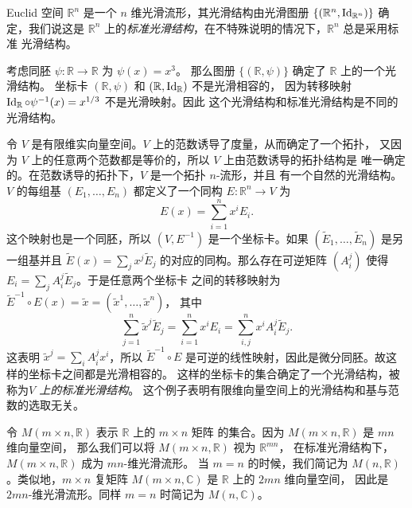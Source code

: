 \begin{example}[Euclid 空间]
  Euclid 空间 $\mathbb{R}^n$ 是一个 $n$ 维光滑流形，其光滑结构由光滑图册
  $\{(\mathbb{R}^n,\operatorname{Id}_{\mathbb{R}^n})\}$ 确定，我们说这是 $\mathbb{R}^n$
  上的\emph{标准光滑结构}，在不特殊说明的情况下，$\mathbb{R}^n$ 总是采用标准
  光滑结构。
\end{example}

\begin{example}
  考虑同胚 $\psi:\mathbb{R}\to\mathbb{R}$ 为 $\psi(x)=x^{3}$。
  那么图册 $\{(\mathbb{R},\psi)\}$ 确定了 $\mathbb{R}$ 上的一个光滑结构。
  坐标卡 $(\mathbb{R},\psi)$ 和 $(\mathbb{R},\operatorname{Id}_{\mathbb{R}})$ 不是光滑相容的，
  因为转移映射 $\operatorname{Id}_{\mathbb{R}}\circ\psi^{-1}(x)=x^{1/3}$ 不是光滑映射。因此
  这个光滑结构和标准光滑结构是不同的光滑结构。
\end{example}

\begin{example}[有限维向量空间]\label{exa:finite-dim vector space as manifold}
  令 $V$ 是有限维实向量空间。$V$ 上的范数诱导了度量，从而确定了一个拓扑，
  又因为 $V$ 上的任意两个范数都是等价的，所以 $V$ 上由范数诱导的拓扑结构是
  唯一确定的。在范数诱导的拓扑下，$V$ 是一个拓扑 $n$-流形，并且
  有一个自然的光滑结构。$V$ 的每组基 $(E_1,\dots,E_n)$ 都定义了一个同构
  $E:\mathbb{R}^n\to V$ 为
  \[
    E(x)=\sum_{i=1}^n x^iE_i.  
  \]
  这个映射也是一个同胚，所以 $(V,E^{-1})$ 是一个坐标卡。如果
  $(\tilde{E}_1,\dots,\tilde{E}_n)$ 是另一组基并且
  $\tilde{E}(x)=\sum_j x^j\tilde{E}_j$ 的对应的同构。那么存在可逆矩阵
  $(A_i^j)$ 使得 $E_i=\sum_j A_i^j\tilde{E}_j$。于是任意两个坐标卡
  之间的转移映射为 $\tilde{E}^{-1}\circ E(x)=\tilde{x}=\left(\tilde{x}^1,\dots,\tilde{x}^n\right)$，
  其中
  \[
    \sum_{j=1}^n\tilde{x}^j\tilde{E}_j=\sum_{i=1}^nx^iE_i=\sum_{i,j}^nx^iA_{i}^j\tilde{E}_j.  
  \]
  这表明 $\tilde{x}^j=\sum_iA_i^jx^i$，所以 $\tilde{E}^{-1}\circ E$
  是可逆的线性映射，因此是微分同胚。故这样的坐标卡之间都是光滑相容的。
  这样的坐标卡的集合确定了一个光滑结构，被称为\emph{$V$ 上的标准光滑结构}。
  这个例子表明有限维向量空间上的光滑结构和基与范数的选取无关。
\end{example}

\begin{example}[矩阵空间]
  令 $M(m\times n,\mathbb{R})$ 表示 $\mathbb{R}$ 上的 $m\times n$ 矩阵
  的集合。因为 $M(m\times n,\mathbb{R})$ 是 $mn$ 维向量空间，
  那么我们可以将 $M(m\times n,\mathbb{R})$ 视为 $\mathbb{R}^{mn}$，
  在标准光滑结构下，$M(m\times n,\mathbb{R})$ 成为 $mn$-维光滑流形。
  当 $m=n$ 的时候，我们简记为 $M(n,\mathbb{R})$。类似地，$m\times n$
  复矩阵 $M(m\times n,\mathbb{C})$ 是 $\mathbb{R}$ 上的 $2mn$ 维向量空间，
  因此是 $2mn$-维光滑流形。同样 $m=n$ 时简记为 $M(n,\mathbb{C})$。
\end{example}

